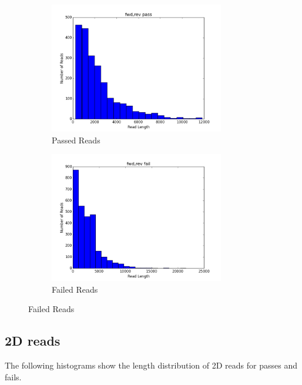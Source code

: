 \documentclass[11pt]{article}
\begin{document}
        \begin{figure}[h!]
		\begin{subfigure}[b]{0.45\textwidth}
    			\includegraphics[width=3in]{1Dpasses}
    			\caption{Passed Reads}
  		\end{subfigure}
  		\begin{subfigure}[b]{0.45\textwidth}
    			\includegraphics[width=3in]{1Dfailures}
    			\caption{Failed Reads}
  		\end{subfigure}
	\end{figure}
        

\subsection*{2D reads}

        The following histograms show the length distribution of 2D reads for passes and fails.
\end{document}
